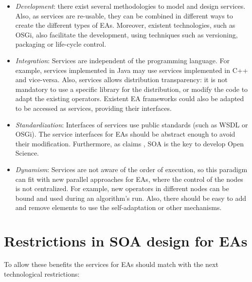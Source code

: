 \begin{itemize}
\item {\em Development}: there exist several methodologies to model and design services. Also, as services are re-usable, they can be combined in different ways to create the different types of EAs. Moreover, existent technologies, such as OSGi, also facilitate the development, using techniques such as versioning, packaging or life-cycle control.
\item {\em Integration}: Services are independent of the programming language. For example, services implemented in Java may use services implemented in C++ and vice-versa. Also, services allows distribution transparency: it is not mandatory to use a specific library for the distribution, or modify the code to adapt the existing operators. Existent EA frameworks could also be adapted to be accessed as services, providing their interfaces. 
\item {\em Standardization}: Interfaces of services use public standards (such as WSDL or OSGi). The service interfaces for EAs should be abstract enough to avoid their modification. Furthermore, as  claims \cite{Foster2005Science}, SOA is the key to develop Open Science.
\item {\em Dynamism}: Services are not aware of the order of execution, so this paradigm can fit with new parallel approaches for EAs, where the control of the nodes is not centralized. For example, new operators in different nodes can be bound and used during an algorithm's run. Also, there should be easy to add and remove elements to use the self-adaptation or other mechanisms.
\end{itemize} 










\section{Restrictions in SOA design for EAs}
\label{sec:soa:restrictions}
To allow these benefits the services for EAs should match with the next technological
restrictions: %

